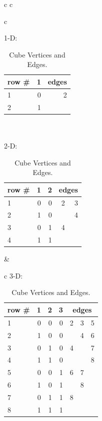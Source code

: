 \begin{table}[htp]
  \centering
  \begin{tabular}{c c}

    \begin{tabular}{c}

      1-D: \\

      \begin{tabular}{|l ||r|| r|}
        \hline
        row \# & 1 & edges \\
        \hline
        1 & 0 & 2\\
        \hline
        2 & 1 & \\
        \hline
      \end{tabular}
      \\
      \\
      2-D: \\

      \begin{tabular}{|l ||r|r|| r r|}
        \hline
        row \# & 1 & 2 & \multicolumn{2}{c|}{edges} \\
        \hline
        1 & 0 & 0 & 2 & 3\\
        \hline
        2 & 1 & 0 &  & 4 \\
        \hline
        3 & 0 & 1 &  4 & \\
        \hline
        4 & 1 & 1 &  & \\
        \hline
      \end{tabular}
    \end{tabular}

    &

    \begin{tabular}{c}
      3-D: \\

      \begin{tabular}{|l ||r|r|r|| r r r|}
        \hline
        row \# & 1 & 2 & 3 & \multicolumn{3}{c|}{edges} \\
        \hline
        1 & 0 & 0& 0 & 2 & 3 & 5\\
        \hline
        2 & 1 & 0 & 0 & & 4 & 6\\
        \hline
        3 & 0 & 1 & 0 & 4 & & 7\\
        \hline
        4 & 1 & 1 & 0 & & & 8\\
        \hline
        5 & 0 & 0 & 1 & 6 & 7 & \\
        \hline
        6 & 1 & 0 & 1 & & 8 & \\
        \hline
        7 & 0 & 1 & 1 & 8 & & \\
        \hline
        8 & 1 & 1 & 1 & & & \\
        \hline
      \end{tabular}
    \end{tabular}
  \end{tabular}

  \caption{Cube Vertices and Edges.}
  \label{verticetable}
\end{table}

